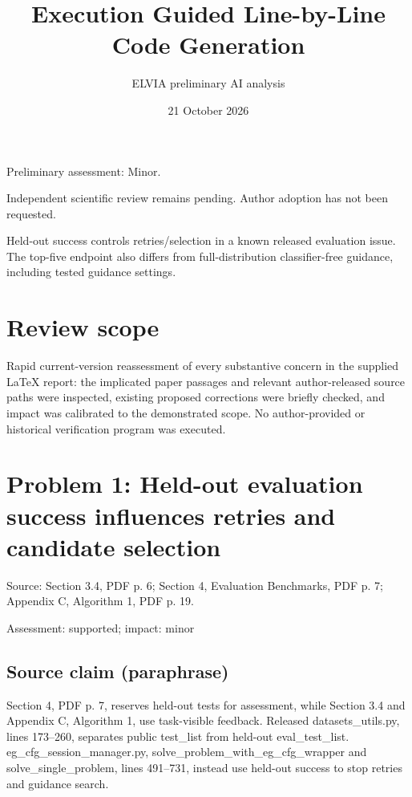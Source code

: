\documentclass[11pt]{article}
\begin{document}
\title{Execution Guided Line-by-Line Code Generation}

\author{ELVIA preliminary AI analysis}\date{21 October 2026}\maketitle

Preliminary assessment: Minor.\par

Independent scientific review remains pending. Author adoption has not been requested.

Held-out success controls retries/selection in a known released evaluation issue. The top-five endpoint also differs from full-distribution classifier-free guidance, including tested guidance settings.

\section*{Review scope}

Rapid current-version reassessment of every substantive concern in the supplied LaTeX report: the implicated paper passages and relevant author-released source paths were inspected, existing proposed corrections were briefly checked, and impact was calibrated to the demonstrated scope. No author-provided or historical verification program was executed.

\section*{Problem 1: Held-out evaluation success influences retries and candidate selection}

Source: Section 3.4, PDF p. 6; Section 4, Evaluation Benchmarks, PDF p. 7; Appendix C, Algorithm 1, PDF p. 19.

Assessment: supported; impact: minor

\subsection*{Source claim (paraphrase)}

Section 4, PDF p. 7, reserves held-out tests for assessment, while Section 3.4 and Appendix C, Algorithm 1, use task-visible feedback. Released datasets\_utils.py, lines 173–260, separates public test\_list from held-out eval\_test\_list. eg\_cfg\_session\_manager.py, solve\_problem\_with\_eg\_cfg\_wrapper and solve\_single\_problem, lines 491–731, instead use held-out success to stop retries and guidance search.
\end{document}
